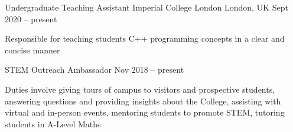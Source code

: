 

\begin{cventries}


\cventry
{Undergraduate Teaching Assistant} %
{Imperial College London} %
{London, UK} %
{Sept 2020 -- present} %
{
  \begin{cvitems} %
    \item Responsible for teaching students C++ programming concepts in a clear and concise manner
  \end{cvitems}
}

\cventry
{STEM Outreach Ambassador} %
{} %
{} %
{Nov 2018 -- present} %
{
  \begin{cvitems} %
    \item Duties involve giving tours of campus to visitors and prospective students, answering questions and providing insights about the College, assisting with virtual and in-person events, mentoring students to promote STEM, tutoring students in A-Level Maths
  \end{cvitems}
}


\end{cventries}
